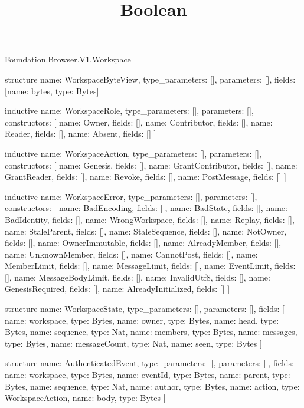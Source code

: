 \begin{lexlean}{Foundation.Browser.V1.Workspace}
\title{Boolean}
\begin{semanticmodule}
structure{
  name: WorkspaceByteView,
  type_parameters: [],
  parameters: [],
  fields: [{name: bytes, type: Bytes}]
}

inductive{
  name: WorkspaceRole,
  type_parameters: [],
  parameters: [],
  constructors: [
    {name: Owner, fields: []},
    {name: Contributor, fields: []},
    {name: Reader, fields: []},
    {name: Absent, fields: []}
  ]
}

inductive{
  name: WorkspaceAction,
  type_parameters: [],
  parameters: [],
  constructors: [
    {name: Genesis, fields: []},
    {name: GrantContributor, fields: []},
    {name: GrantReader, fields: []},
    {name: Revoke, fields: []},
    {name: PostMessage, fields: []}
  ]
}

inductive{
  name: WorkspaceError,
  type_parameters: [],
  parameters: [],
  constructors: [
    {name: BadEncoding, fields: []},
    {name: BadState, fields: []},
    {name: BadIdentity, fields: []},
    {name: WrongWorkspace, fields: []},
    {name: Replay, fields: []},
    {name: StaleParent, fields: []},
    {name: StaleSequence, fields: []},
    {name: NotOwner, fields: []},
    {name: OwnerImmutable, fields: []},
    {name: AlreadyMember, fields: []},
    {name: UnknownMember, fields: []},
    {name: CannotPost, fields: []},
    {name: MemberLimit, fields: []},
    {name: MessageLimit, fields: []},
    {name: EventLimit, fields: []},
    {name: MessageBodyLimit, fields: []},
    {name: InvalidUtf8, fields: []},
    {name: GenesisRequired, fields: []},
    {name: AlreadyInitialized, fields: []}
  ]
}

structure{
  name: WorkspaceState,
  type_parameters: [],
  parameters: [],
  fields: [
    {name: workspace, type: Bytes},
    {name: owner, type: Bytes},
    {name: head, type: Bytes},
    {name: sequence, type: Nat},
    {name: members, type: Bytes},
    {name: messages, type: Bytes},
    {name: messageCount, type: Nat},
    {name: seen, type: Bytes}
  ]
}

structure{
  name: AuthenticatedEvent,
  type_parameters: [],
  parameters: [],
  fields: [
    {name: workspace, type: Bytes},
    {name: eventId, type: Bytes},
    {name: parent, type: Bytes},
    {name: sequence, type: Nat},
    {name: author, type: Bytes},
    {name: action, type: WorkspaceAction},
    {name: body, type: Bytes}
  ]
}


\end{semanticmodule}
\end{lexlean}
